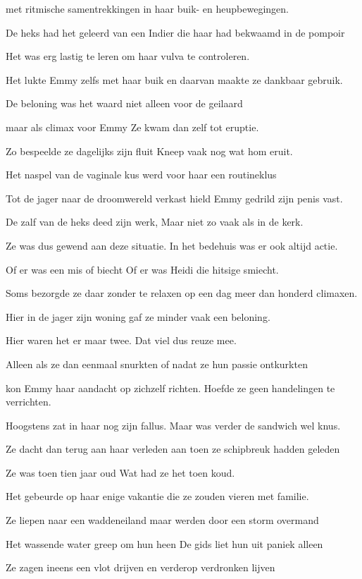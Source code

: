 met ritmische samentrekkingen
in haar buik- en heupbewegingen.

De heks had het geleerd van een Indier
die haar had bekwaamd in de pompoir

Het was erg lastig te leren
om haar vulva te controleren.

Het lukte Emmy zelfs met haar buik
en daarvan maakte ze dankbaar gebruik.

De beloning was het waard
niet alleen voor de geilaard

maar als climax voor Emmy
Ze kwam dan zelf tot eruptie.

Zo bespeelde ze dagelijks zijn fluit
Kneep vaak nog wat hom eruit.

Het naspel van de vaginale kus
werd voor haar een routineklus

Tot de jager naar de droomwereld verkast
hield Emmy gedrild zijn penis vast.

De zalf van de heks deed zijn werk,
Maar niet zo vaak als in de kerk.

Ze was dus gewend aan deze situatie.
In het bedehuis was er ook altijd actie.

Of er was een mis of biecht
Of er was Heidi die hitsige smiecht.

Soms bezorgde ze daar zonder te relaxen
op een dag meer dan honderd climaxen.

Hier in de jager zijn woning
gaf ze minder vaak een beloning.

Hier waren het er maar twee.
Dat viel dus reuze mee.

Alleen als ze dan eenmaal snurkten
of nadat ze hun passie ontkurkten

kon Emmy haar aandacht op zichzelf richten.
Hoefde ze geen handelingen te verrichten.

Hoogstens zat in haar nog zijn fallus.
Maar was verder de sandwich wel knus.

Ze dacht dan terug aan haar verleden
aan toen ze schipbreuk hadden geleden

Ze was toen tien jaar oud
Wat had ze het toen koud.

Het gebeurde op haar enige vakantie
die ze zouden vieren met familie.

Ze liepen naar een waddeneiland
maar werden door een storm overmand

Het wassende water greep om hun heen
De gids liet hun uit paniek alleen

Ze zagen ineens een vlot drijven
en verderop verdronken lijven

